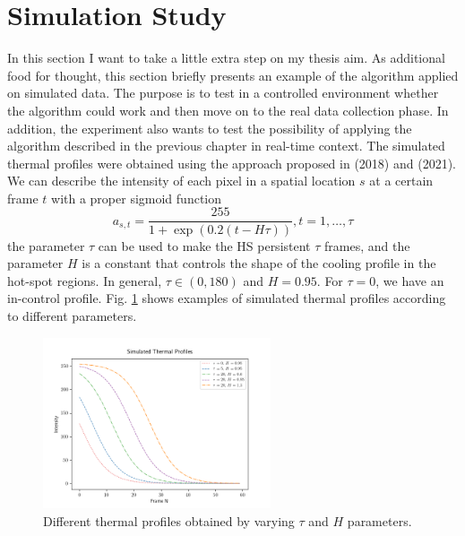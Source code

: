 

\section{Simulation Study}
\label{sec:simstudy}
In this section I want to take a little extra step on my thesis aim. As additional food for thought, this section briefly presents an example of the algorithm applied on simulated data. The purpose is to test in a controlled environment whether the algorithm could work and then move on to the real data collection phase. In addition, the experiment also wants to test the possibility of applying the algorithm described in the previous chapter in real-time context. The simulated thermal profiles were obtained using the approach proposed in \cite{colosimo_spatially_2018} (2018) and \citeauthor{yan_real-time_2021} (2021). We can describe the intensity of each pixel in a spatial location $s$ at a certain frame $t$ with a proper sigmoid function
\begin{equation}
    \label{eq:simulation}
    a_{s, t}=\frac{255}{1+\exp (0.2(t-H \tau))}, t=1, \ldots, \tau
\end{equation}
the parameter $\tau$ can be used to make the HS persistent $\tau$ frames, and the parameter $H$ is a constant that controls the shape of the cooling profile in the hot-spot regions. In general, $\tau \in \left(0,180\right)$ and $H=0.95$. For $\tau=0$, we have an in-control profile. Fig. \ref{fig:simulationprofile} shows examples of simulated thermal profiles according to different parameters.
\begin{figure}
    \centering
    \includegraphics[width=0.6\textwidth]{Images/simulation.png}
   \caption[Simulated profiles.]{Different thermal profiles obtained by varying $\tau$ and $H$ parameters.}
    \label{fig:simulationprofile}
\end{figure}
